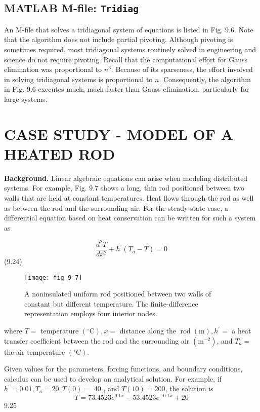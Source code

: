 \documentclass[../main.tex]{subfiles}
\begin{document}
\subsection{MATLAB M-file: \texttt{Tridiag}}

An M-file that solves a tridiagonal system of equations is listed in Fig. 9.6. Note that the algorithm does not include partial pivoting. Although pivoting is sometimes required, most tridiagonal systems routinely solved in engineering and science do not require pivoting.
Recall that the computational effort for Gauss elimination was proportional to $n^{3}$. Because of its sparseness, the effort involved in solving tridiagonal systems is proportional to $n$. Consequently, the algorithm in Fig. $9.6$ executes much, much faster than Gauss elimination, particularly for large systems.
\\

\section{\textbf{CASE STUDY} - MODEL OF A HEATED ROD}

\textbf{Background.} Linear algebraic equations can arise when modeling distributed systems. For example, Fig. $9.7$ shows a long, thin rod positioned between two walls that are held at constant temperatures. Heat flows through the rod as well as between the rod and the surrounding air. For the steady-state case, a differential equation based on heat conservation can be written for such a system as

$$
\frac{d^{2} T}{d x^{2}}+h^{\prime}\left(T_{a}-T\right)=0 
$$ \hfill{(9.24)}

\begin{figure}[H]
    \centering
    \texttt{[image: fig\_9\_7]}
    \caption{\textsf{A noninsulated uniform rod positioned between two walls of constant but different temperature.
    The finite-difference representation employs four interior nodes.}}
    \label{fig:fig_9_7}
\end{figure}

where $T=$ temperature $\left({ }^{\circ} \mathrm{C}\right), x=$ distance along the $\operatorname{rod}(\mathrm{m}), h^{\prime}=$ a heat transfer coefficient between the rod and the surrounding air $\left(\mathrm{m}^{-2}\right)$, and $T_{a}=$ the air temperature $\left({ }^{\circ} \mathrm{C}\right)$.

Given values for the parameters, forcing functions, and boundary conditions, calculus can be used to develop an analytical solution. For example, if $h^{\prime}=0.01, T_{a}=20, T(0)=$ 40 , and $T(10)=200$, the solution is
$$
T=73.4523 e^{0.1 x}-53.4523 e^{-0.1 x}+20
$$ \hfill{9.25}
\end{document}
